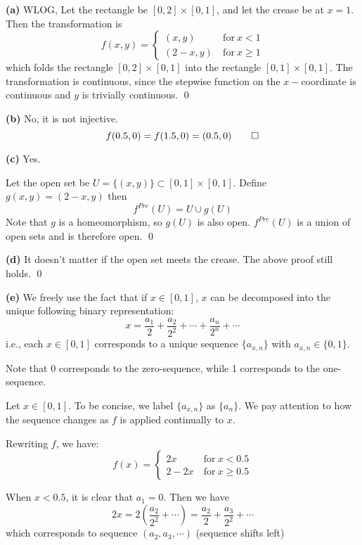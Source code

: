 \documentclass[a4paper, 12pt]{article}
\begin{document}
\begin{solution}
    \textbf{(a)} WLOG, Let the rectangle be $[0, 2] \times [0, 1]$, and let the crease be at $x = 1$. Then the transformation is \[
        f(x, y) = \begin{cases}
            (x, y)   & \:\text{for}\: x < 1    \\
            (2-x, y) & \:\text{for}\: x \geq 1
        \end{cases}
    \]
    which folds the rectangle $[0, 2] \times [0,1]$ into the rectangle $[0, 1] \times [0, 1]$. The transformation is continuous, since the stepwise function on the $x-$coordinate is continuous and $y$ is trivially continuous. \qed

    \textbf{(b)} No, it is not injective.
    \[
        f(0.5, 0) = f(1.5, 0) = (0.5, 0) \qed
    \]

    \textbf{(c)} Yes.

    Let the open set be $U = \{(x, y)\} \subset [0, 1] \times [0, 1]$. Define $g(x, y) = (2-x, y)$ then \[
        f^{Pre}(U) = U \cup g(U)
    \]
    Note that $g$ is a homeomorphism, so $g(U)$ is also open. $f^{Pre}(U)$ is a union of open sets and is therefore open. \qed

    \textbf{(d)} It doesn't matter if the open set meets the crease. The above proof still holds. \qed

    \textbf{(e)} We freely use the fact that if $x \in [0, 1]$, $x$ can be decomposed into the unique following binary representation:
    \[
    x = \frac{a_1}{2} + \frac{a_2}{2^2} + \cdots + \frac{a_n}{2^n} + \cdots
    \]
    i.e., each $x \in [0, 1]$ corresponds to a unique sequence $\{a_{x, n}\} $ with $a_{x, n} \in \{0, 1\}$.

    Note that 0 corresponds to the zero-sequence, while 1 corresponds to the one-sequence.

    Let $x \in [0, 1]$. To be concise, we label $\{a_{x, n}\}$ as $\{a_n\}$. We pay attention to how the sequence changes as $f$ is applied continually to $x$.
    
    Rewriting $f$, we have: \[
    f(x) = \begin{cases}
        2x & \:\text{for}\: x < 0.5 \\
        2 - 2x & \:\text{for}\: x \geq 0.5
    \end{cases}
    \]
    
    When $x < 0.5$, it is clear that $a_1 = 0$. Then we have \[
     2x = 2 \left(\frac{a_2}{2^2} + \cdots \right) = \frac{a_2}{2} + \frac{a_3}{2^2} + \cdots
    \]
    which corresponds to sequence $(a_2, a_3, \cdots)$ (sequence shifts left)


\end{solution}
\end{document}
